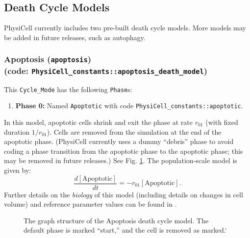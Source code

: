 \documentclass[12pt]{article}
\newcommand{\beq}{\begin{equation}}
\newcommand{\eeq}{\end{equation}}
\renewcommand{\v}{\verb}
\renewcommand{\t}[1]{\left[\mathrm{#1}\right]}
\begin{document}
\subsection{Death Cycle Models}
\label{sec:Standard_Models:Death}
PhysiCell currently includes two pre-built death cycle models. More models 
may be added in future releases, such as autophagy. 

\subsubsection{Apoptosis (\texttt{apoptosis})\\
(code: \texttt{PhysiCell\_constants::apoptosis\_death\_model})}
\label{sec:Standard_Models:Apoptosis}
This \v|Cycle_Mode| has the following \v|Phase|s: 
\begin{enumerate}
\item 
\textbf{Phase 0:} Named \v|Apoptotic| with code \v|PhysiCell_constants::apoptotic|. 
\end{enumerate}
In this model, apoptotic cells shrink and exit the phase at 
rate $r_{01}$ (with fixed duration $1 / r_{01}$). Cells are removed 
from the simulation at the end of the apoptotic phase. 
(PhysiCell currently uses a dummy ``debris'' phase to avoid coding a 
phase transition from the apoptotic phase to the apoptotic phase; this 
may be removed in future releases.) 
See Fig. \ref{fig:death_model:apoptosis}. The 
population-scale model is given by: 
\beq
\frac{d\t{Apoptotic}}{dt} = -r_{01} \t{Apoptotic}. 
\eeq
Further details on the \emph{biology} of this model (including 
details on changes in cell volume) and reference parameter values can be found in \cite{ref:PhysiCell}. 

\begin{figure}
\begin{mdframed}[style=mystyle]
\caption{The graph structure of the Apoptosis death cycle model. The default phase is marked 
``start,'' and the cell is removed as marked.`}
\label{fig:death_model:apoptosis}
\end{mdframed}
\end{figure}
\end{document}
